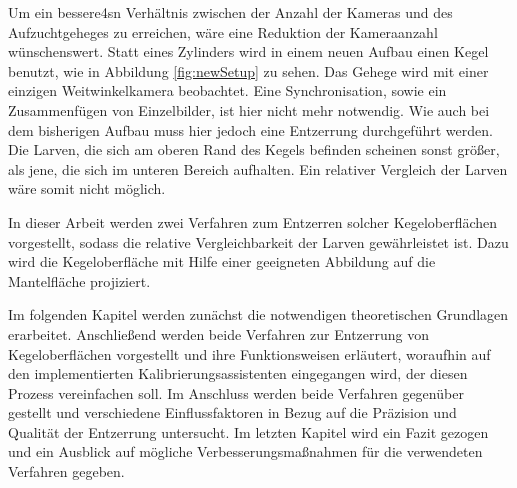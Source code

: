 Um ein bessere4sn Verhältnis zwischen der Anzahl der Kameras und des Aufzuchtgeheges zu erreichen, wäre eine Reduktion der Kameraanzahl wünschenswert.
Statt eines Zylinders wird in einem neuen Aufbau einen Kegel benutzt, wie in Abbildung \ref{fig:newSetup} zu sehen. Das Gehege wird mit einer einzigen Weitwinkelkamera beobachtet. Eine Synchronisation, sowie ein Zusammenfügen von Einzelbilder, ist hier nicht mehr notwendig.
Wie auch bei dem bisherigen Aufbau muss hier jedoch eine Entzerrung durchgeführt werden. Die Larven, die sich am oberen Rand des Kegels befinden scheinen sonst größer, als jene, die sich im unteren Bereich aufhalten. Ein relativer Vergleich der Larven wäre somit nicht möglich.

In dieser Arbeit werden zwei Verfahren zum Entzerren solcher Kegeloberflächen vorgestellt, sodass die relative Vergleichbarkeit der Larven gewährleistet ist.
Dazu wird die Kegeloberfläche mit Hilfe einer geeigneten Abbildung auf die Mantelfläche projiziert.

Im folgenden Kapitel werden zunächst die notwendigen theoretischen Grundlagen erarbeitet.
Anschließend werden beide Verfahren zur Entzerrung von Kegeloberflächen vorgestellt und ihre Funktionsweisen erläutert, woraufhin auf den implementierten Kalibrierungsassistenten eingegangen wird, der diesen Prozess vereinfachen soll.
Im Anschluss werden beide Verfahren gegenüber gestellt und verschiedene Einflussfaktoren in Bezug auf die Präzision und Qualität der Entzerrung untersucht.
Im letzten Kapitel wird ein Fazit gezogen und ein Ausblick auf mögliche Verbesserungsmaßnahmen für die verwendeten Verfahren gegeben.
